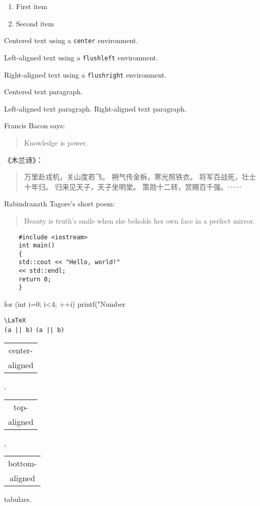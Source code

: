 \documentclass{ctexart}
\begin{document}
\renewcommand{\labelenumi}%
{\Alph{enumi}>}
\begin{enumerate}
\item First item
\item Second item
\end{enumerate}

\begin{center}
Centered text using a
\verb|center| environment.
\end{center}
\begin{flushleft}
Left-aligned text using a
\verb|flushleft| environment.
\end{flushleft}
\begin{flushright}
Right-aligned text using a
\verb|flushright| environment.
\end{flushright}

\centering
Centered text paragraph.
\raggedright
Left-aligned text paragraph.
\raggedleft
Right-aligned text paragraph.

Francis Bacon says:
\begin{quote}
Knowledge is power.
\end{quote}

《木兰诗》：
\begin{quotation}
万里赴戎机，关山度若飞。
朔气传金柝，寒光照铁衣。
将军百战死，壮士十年归。
归来见天子，天子坐明堂。
策勋十二转，赏赐百千强。⋯⋯
\end{quotation}

Rabindranath Tagore's short poem:
\begin{verse}
Beauty is truth's smile
when she beholds her own face in
a perfect mirror.
\end{verse}

\begin{verbatim}
    #include <iostream>
    int main()
    {
    std::cout << "Hello, world!"
    << std::endl;
    return 0;
    }
\end{verbatim}

\begin{verbatim*}
    for (int i=0; i<4; ++i)
    printf("Number %d\n",i);
\end{verbatim*}

\verb|\LaTeX| \\
\verb+(a || b)+ \verb*+(a || b)+

\begin{tabular}{|c|}
center-\\ aligned \\
\end{tabular},
\begin{tabular}[t]{|c|}
top-\\ aligned \\
\end{tabular},
\begin{tabular}[b]{|c|}
bottom-\\ aligned\\
\end{tabular} tabulars.
\end{document}
